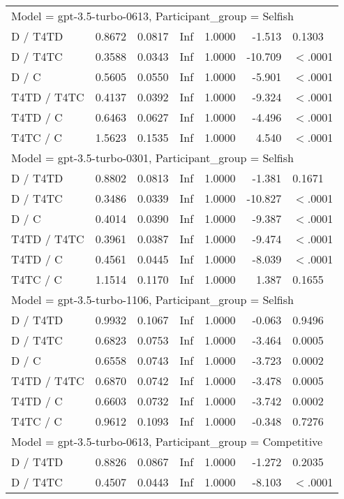 \begin{table}[ht]
\begin{tabular}{lrrrrrl}
   \hline
\multicolumn{7}{l}{Model = gpt-3.5-turbo-0613, Participant_group = Selfish}\\
D / T4TD & 0.8672 & 0.0817 & Inf & 1.0000 & -1.513 & 0.1303 \\ 
  D / T4TC & 0.3588 & 0.0343 & Inf & 1.0000 & -10.709 & $<$.0001 \\ 
  D / C & 0.5605 & 0.0550 & Inf & 1.0000 & -5.901 & $<$.0001 \\ 
  T4TD / T4TC & 0.4137 & 0.0392 & Inf & 1.0000 & -9.324 & $<$.0001 \\ 
  T4TD / C & 0.6463 & 0.0627 & Inf & 1.0000 & -4.496 & $<$.0001 \\ 
  T4TC / C & 1.5623 & 0.1535 & Inf & 1.0000 & 4.540 & $<$.0001 \\ 
   \hline
\multicolumn{7}{l}{Model = gpt-3.5-turbo-0301, Participant_group = Selfish}\\
D / T4TD & 0.8802 & 0.0813 & Inf & 1.0000 & -1.381 & 0.1671 \\ 
  D / T4TC & 0.3486 & 0.0339 & Inf & 1.0000 & -10.827 & $<$.0001 \\ 
  D / C & 0.4014 & 0.0390 & Inf & 1.0000 & -9.387 & $<$.0001 \\ 
  T4TD / T4TC & 0.3961 & 0.0387 & Inf & 1.0000 & -9.474 & $<$.0001 \\ 
  T4TD / C & 0.4561 & 0.0445 & Inf & 1.0000 & -8.039 & $<$.0001 \\ 
  T4TC / C & 1.1514 & 0.1170 & Inf & 1.0000 & 1.387 & 0.1655 \\ 
   \hline
\multicolumn{7}{l}{Model = gpt-3.5-turbo-1106, Participant_group = Selfish}\\
D / T4TD & 0.9932 & 0.1067 & Inf & 1.0000 & -0.063 & 0.9496 \\ 
  D / T4TC & 0.6823 & 0.0753 & Inf & 1.0000 & -3.464 & 0.0005 \\ 
  D / C & 0.6558 & 0.0743 & Inf & 1.0000 & -3.723 & 0.0002 \\ 
  T4TD / T4TC & 0.6870 & 0.0742 & Inf & 1.0000 & -3.478 & 0.0005 \\ 
  T4TD / C & 0.6603 & 0.0732 & Inf & 1.0000 & -3.742 & 0.0002 \\ 
  T4TC / C & 0.9612 & 0.1093 & Inf & 1.0000 & -0.348 & 0.7276 \\ 
   \hline
\multicolumn{7}{l}{Model = gpt-3.5-turbo-0613, Participant_group = Competitive}\\
D / T4TD & 0.8826 & 0.0867 & Inf & 1.0000 & -1.272 & 0.2035 \\ 
  D / T4TC & 0.4507 & 0.0443 & Inf & 1.0000 & -8.103 & $<$.0001 \\ 

\end{tabular}
\end{table}
